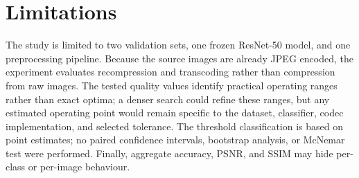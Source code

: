 \section{Limitations}

The study is limited to two validation sets, one frozen ResNet-50 model, and one preprocessing pipeline. Because the source images are already JPEG encoded, the experiment evaluates recompression and transcoding rather than compression from raw images. The tested quality values identify practical operating ranges rather than exact optima; a denser search could refine these ranges, but any estimated operating point would remain specific to the dataset, classifier, codec implementation, and selected tolerance. The threshold classification is based on point estimates; no paired confidence intervals, bootstrap analysis, or McNemar test were performed. Finally, aggregate accuracy, PSNR, and SSIM may hide per-class or per-image behaviour.
